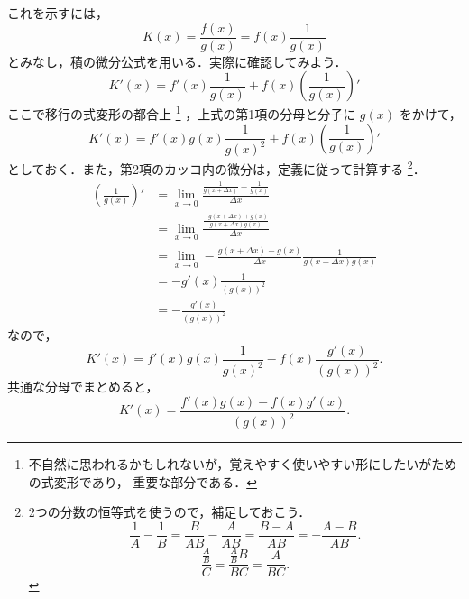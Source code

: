     これを示すには，
        \begin{equation*}
            K(x) = \frac{f(x)}{g(x)} = f(x)\frac{1}{g(x)}
        \end{equation*}
    とみなし，積の微分公式を用いる．実際に確認してみよう．
        \begin{equation*}
            K'(x) = f'(x)\frac{1}{g(x)} + f(x)\left(\frac{1}{g(x)}\right)'
        \end{equation*}
    ここで移行の式変形の都合上
        \footnote{
            不自然に思われるかもしれないが，覚えやすく使いやすい形にしたいがための式変形であり，
            重要な部分である．
        }
    ，上式の第1項の分母と分子に $g(x)$ をかけて，
        \begin{equation*}
            K'(x) = f'(x)g(x)\frac{1}{{g(x)}^{2}} + f(x)\left(\frac{1}{g(x)}\right)'
        \end{equation*}
    としておく．また，第2項のカッコ内の微分は，定義に従って計算する
        \footnote{
            2つの分数の恒等式を使うので，補足しておこう．
            \begin{equation*}
                \frac{1}{A} - \frac{1}{B}
                = \frac{B}{AB} - \frac{A}{AB}
                = \frac{B-A}{AB}
                = - \frac{A-B}{AB}.
            \end{equation*}
            \begin{equation*}
                \frac{\displaystyle\frac{A}{B}}{C}
                = \frac{\displaystyle\frac{A}{B}B}{BC}
                = \frac{A}{BC}.
            \end{equation*}
        }．
        \begin{align*}
            \left(\frac{1}{g(x)}\right)'
            &= \lim_{x \to 0}
               \frac{\displaystyle\frac{1}{g(x + \Delta x)} - \displaystyle\frac{1}{g(x)}}{\Delta x} \\
            &= \lim_{x \to 0}
               \frac{\displaystyle\frac{-g(x + \Delta x)+g(x)}{g(x + \Delta x)g(x)}}{\Delta x} \\
            &= \lim_{x \to 0}
               -\frac{g(x + \Delta x)-g(x)}{\Delta x}\frac{1}{{g(x + \Delta x)g(x)}} \\
            &= -g'(x) \frac{1}{{\left(g(x)\right)}^{2}} \\
            &= -\frac{g'(x)}{{\left(g(x)\right)}^{2}}
        \end{align*}
    なので，
        \begin{equation*}
            K'(x) = f'(x)g(x)\frac{1}{{g(x)}^{2}}-f(x)\frac{g'(x)}{{\left(g(x)\right)}^{2}}.
        \end{equation*}
    共通な分母でまとめると，
        \begin{equation*}
            K'(x) = \frac{f'(x)g(x)-f(x)g'(x)}{{\left(g(x)\right)}^{2}}.
        \end{equation*}

